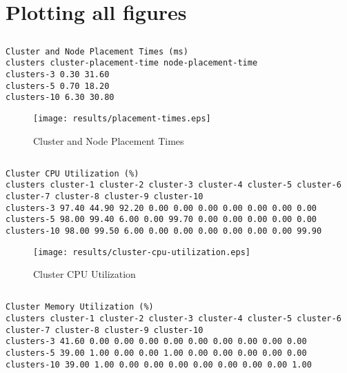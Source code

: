 \documentclass{elsart}
\begin{document}
\section{Plotting all figures}
\subsection{}

\begin{lstlisting}[caption={Cluster and Node Placement Times}]
Cluster and Node Placement Times (ms)
clusters cluster-placement-time node-placement-time
clusters-3 0.30 31.60
clusters-5 0.70 18.20
clusters-10 6.30 30.80
\end{lstlisting}

\begin{figure}[ht]
\centering
\texttt{[image: results/placement-times.eps]}
\caption{Cluster and Node Placement Times}\label{fig:placement-times.eps}
\end{figure}

\subsection{}

\begin{lstlisting}[caption={Cluster CPU Utilization}]
Cluster CPU Utilization (%)
clusters cluster-1 cluster-2 cluster-3 cluster-4 cluster-5 cluster-6 cluster-7 cluster-8 cluster-9 cluster-10
clusters-3 97.40 44.90 92.20 0.00 0.00 0.00 0.00 0.00 0.00 0.00
clusters-5 98.00 99.40 6.00 0.00 99.70 0.00 0.00 0.00 0.00 0.00
clusters-10 98.00 99.50 6.00 0.00 0.00 0.00 0.00 0.00 0.00 99.90
\end{lstlisting}

\begin{figure}[ht]
\centering
\texttt{[image: results/cluster-cpu-utilization.eps]}
\caption{Cluster CPU Utilization}\label{fig:cluster-cpu-utilization.eps}
\end{figure}

\subsection{}

\begin{lstlisting}[caption={Cluster Memory Utilization}]
Cluster Memory Utilization (%)
clusters cluster-1 cluster-2 cluster-3 cluster-4 cluster-5 cluster-6 cluster-7 cluster-8 cluster-9 cluster-10
clusters-3 41.60 0.00 0.00 0.00 0.00 0.00 0.00 0.00 0.00 0.00
clusters-5 39.00 1.00 0.00 0.00 1.00 0.00 0.00 0.00 0.00 0.00
clusters-10 39.00 1.00 0.00 0.00 0.00 0.00 0.00 0.00 0.00 1.00
\end{lstlisting}
\end{document}
